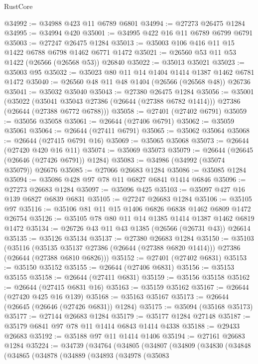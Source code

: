 \begin{lexlean}{RustCore}
\begin{coremodule}
@34992 := @34988 @423 @11 @6789 @6801
@34994 := @27273 @26475 @1284
@34995 := @34994 @420
@35001 := @34995 @422 @16 @11 @6789 @6799 @6791
@35003 := @27247 @26475 @1284
@35013 := @35003 @106 @416 @11 @15 @1422 @6788 @6798 @1462 @6771 @1472
@35021 := @26560 @53 @11 @53 @1422 (@26566 (@26568 @53)) @26840
@35022 := @35013 @35021
@35023 := @35003 @95
@35032 := @35023 @80 @11 @14 @1404 @1414 @1387 @1462 @6781 @1472
@35040 := @26560 @48 @11 @48 @1404 (@26566 (@26568 @48)) @26736
@35041 := @35032 @35040
@35043 := @27380 @26475 @1284
@35056 := @35001
    (@35022
      (@35041 @35043 @27386 (@26644 (@27388 @6782 @1414)))
      @27386
      (@26644 (@27388 @6772 @6788)))
@35058 := @27401 (@27402 @6791)
@35059 := @35056 @35058
@35061 := @26644 (@27406 @6791)
@35062 := @35059 @35061
@35064 := @26644 (@27411 @6791)
@35065 := @35062 @35064
@35068 := @26644 (@27415 @6791 @16)
@35069 := @35065 @35068
@35073 := @26644 (@27420 @420 @16 @11)
@35074 := @35069 @35073
@35079 := @26644 (@26645 (@26646 (@27426 @6791)) @1284)
@35083 := @34986 (@34992 (@35074 @35079)) @26676
@35085 := @27066 @26683 @1284
@35086 := @35085 @1284
@35094 := @35086 @428 @97 @78 @11 @6827 @6841 @1414 @6846
@35096 := @27273 @26683 @1284
@35097 := @35096 @425
@35103 := @35097 @427 @16 @139 @6827 @6839 @6831
@35105 := @27247 @26683 @1284
@35106 := @35105 @97
@35116 := @35106 @81 @11 @15 @1406 @6826 @6838 @1462 @6809 @1472 @26754
@35126 := @35105 @78 @80 @11 @14 @1385 @1414 @1387 @1462 @6819 @1472
@35134 := @26726 @43 @11 @43 @1385 (@26566 (@26731 @43)) @26614
@35135 := @35126 @35134
@35137 := @27380 @26683 @1284
@35150 := @35103
    (@35116
      (@35135 @35137 @27386 (@26644 (@27388 @6820 @1414)))
      @27386
      (@26644 (@27388 @6810 @6826)))
@35152 := @27401 (@27402 @6831)
@35153 := @35150 @35152
@35155 := @26644 (@27406 @6831)
@35156 := @35153 @35155
@35158 := @26644 (@27411 @6831)
@35159 := @35156 @35158
@35162 := @26644 (@27415 @6831 @16)
@35163 := @35159 @35162
@35167 := @26644 (@27420 @425 @16 @139)
@35168 := @35163 @35167
@35173 := @26644 (@26645 (@26646 (@27426 @6831)) @1284)
@35175 := @35094 (@35168 @35173)
@35177 := @27144 @26683 @1284
@35179 := @35177 @1284 @27148
@35187 := @35179 @6841 @97 @78 @11 @1414 @6843 @1414 @4338
@35188 := @29433 @26683
@35192 := @35188 @97 @11 @1414 @1406
@35194 := @27161 @26683 @1284
@35224 := @34739
    (@34764
      (@34805
        (@34807
          (@34809
            (@34830
              (@34848
                (@34865
                  (@34878
                    (@34889
                      (@34893
                        (@34978
                          (@35083

\end{coremodule}
\end{lexlean}
